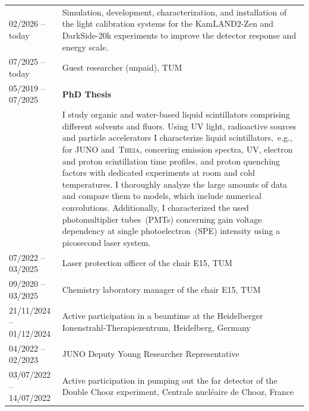 \documentclass[letterpaper,12pt, oneside]{article}
\newlength{\cvSectionBefore}
\newlength{\cvSectionAfter}
\newlength{\cvSectionToTable}
\newcommand{\cvsection}[1]{\par\vspace{\cvSectionBefore}{\Large\textbf{#1}}\par\vspace{\cvSectionAfter}}
\begin{document}
\cvsection{Professional Activities}\vspace{\cvSectionToTable}
\vspace{0.5em}
\begin{tabular}{@{} l p{12cm}}

	02/2026 – today &  Simulation, development, characterization, and installation of the light calibration systems for the KamLAND2-Zen and DarkSide-20k experiments to improve the detector response and energy scale. \vspace{0.35em}\\

	07/2025 – today & Guest researcher (unpaid), TUM \vspace{0.35em}\\
	05/2019 – 07/2025 & \textbf{PhD Thesis}\\
  	& I study organic and water-based liquid scintillators comprising different solvents and fluors. Using UV light, radioactive sources and particle accelerators
	I characterize liquid scintillators,~e.g., for JUNO and~\textsc{Theia}, concering emission spectra, UV, electron and proton scintillation time profiles, and proton quenching factors with dedicated experiments at room and cold temperatures.
	I thoroughly analyze the large amounts of data and compare them to models, which include numerical convolutions.
	Additionally, I characterized the used photomultiplier tubes~(PMTs) concerning gain voltage dependency at single photoelectron~(SPE) intensity using a picosecond laser system.\vspace{0.35em}\\

	07/2022 – 03/2025 & Laser protection officer of the chair E15, TUM \vspace{0.35em}\\

	09/2020 – 03/2025 & Chemistry laboratory manager of the chair E15, TUM \vspace{0.35em}\\

	21/11/2024 – 01/12/2024 & Active participation in a beamtime at the Heidelberger Ionenstrahl-Therapiezentrum, Heidelberg, Germany \vspace{0.35em}\\

	04/2022 – 02/2023 & JUNO Deputy Young Researcher Representative \vspace{0.35em}\\

	03/07/2022 – 14/07/2022 & Active participation in pumping out the far detector of the Double Chooz experiment, Centrale nucléaire de Chooz, France \vspace{0.35em}\\


\end{tabular}
\end{document}

